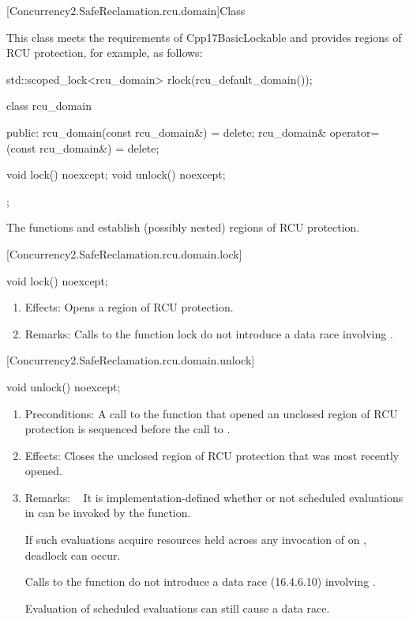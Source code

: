 [Concurrency2.SafeReclamation.rcu.domain]{Class }


This class meets the requirements of Cpp17BasicLockable  and provides regions of RCU protection, for example, as follows:

\begin{codeblock}
std::scoped_lock<rcu_domain> rlock(rcu_default_domain());
\end{codeblock}

\begin{codeblock}
class rcu_domain {
public:
  rcu_domain(const rcu_domain&) = delete;
  rcu_domain& operator=(const rcu_domain&) = delete;

  void lock() noexcept;
  void unlock() noexcept;
};
\end{codeblock}

The functions  and  establish (possibly nested)
regions of RCU protection.

[Concurrency2.SafeReclamation.rcu.domain.lock]{}

\begin{codeblock}
   void lock() noexcept;
\end{codeblock}

\begin{enumerate}
\item	Effects: Opens a region of RCU protection.
\item	Remarks: Calls to the function lock do not introduce a data race
	 involving .
\end{enumerate}

[Concurrency2.SafeReclamation.rcu.domain.unlock]{}

\begin{codeblock}
   void unlock() noexcept;
\end{codeblock}

\begin{enumerate}
\item	Preconditions: A call to the function  that opened
	an unclosed region of RCU protection is sequenced before the
	call to .
\item	Effects: Closes the unclosed region of RCU protection that was
	most recently opened.
\item	Remarks:   It is implementation-defined whether or not scheduled
	evaluations in  can be invoked by the 
	function.
	\begin{note}
	If such evaluations acquire resources held across any invocation
	of  on , deadlock can occur.
	\end{note}
	Calls to the function  do not introduce a data race
	(16.4.6.10) involving \tcode{*this}.
	\begin{note}
	Evaluation of scheduled evaluations can still cause a data race.
	\end{note}
\end{enumerate}


